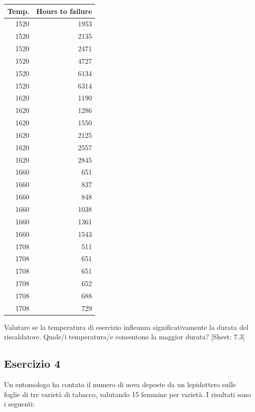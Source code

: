 \documentclass[a4paper,12pt,oneside]{book}
\begin{document}
\begin{longtable}[]{@{}rr@{}}
\toprule()
Temp. & Hours to failure \\
\midrule()
\endhead
1520 & 1953 \\
1520 & 2135 \\
1520 & 2471 \\
1520 & 4727 \\
1520 & 6134 \\
1520 & 6314 \\
1620 & 1190 \\
1620 & 1286 \\
1620 & 1550 \\
1620 & 2125 \\
1620 & 2557 \\
1620 & 2845 \\
1660 & 651 \\
1660 & 837 \\
1660 & 848 \\
1660 & 1038 \\
1660 & 1361 \\
1660 & 1543 \\
1708 & 511 \\
1708 & 651 \\
1708 & 651 \\
1708 & 652 \\
1708 & 688 \\
1708 & 729 \\
\bottomrule()
\end{longtable}

Valutare se la temperatura di esercizio infleunza significativamente la durata del riscaldatore. Quale/i temperatura/e consentono la maggior durata?
{[}Sheet: 7.3{]}

\hypertarget{esercizio-4-5}{%
\subsection{Esercizio 4}\label{esercizio-4-5}}

Un entomologo ha contato il numero di uova deposte da un lepidottero sulle foglie di tre varietà di tabacco, valutando 15 femmine per varietà. I risultati sono i seguenti:
\end{document}
